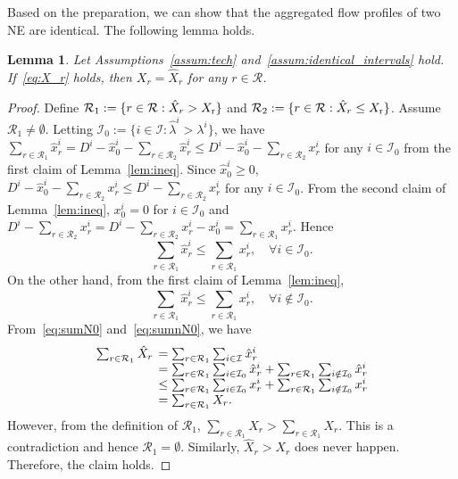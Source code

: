 \documentclass[letterpaper, 10 pt, conference]{ieeeconf}  %
\newcommand{\hs}{& \hspace{-2mm}}
\newcommand{\mc}[1]{\mathcal{#1}}
\newtheorem{lem}{Lemma}
\begin{document}
Based on the preparation, we can show that the aggregated flow profiles of two NE are identical.
The following lemma holds.
\begin{lem}\label{lem:Xr}
Let Assumptions~\ref{assum:tech} and~\ref{assum:identical_intervals} hold.
If~\eqref{eq:X_r} holds,
then $X_r=\hat{X}_r$ for any $r\in\mc{R}$.
\end{lem}
\begin{proof}
Define $\mc{R}_1:=\{r\in\mc{R}: \hat{X}_r>X_{\rm r}\}$ and $\mc{R}_2:=\{r \in \mc{R}: \hat{X}_r\leq X_{\rm r}\}$.
Assume $\mc{R}_1\neq \emptyset$.
Letting $\mc{I}_0:= \{i \in \mc{I}: \hat{\lambda}^i>\lambda^i\}$, we have $\sum_{r\in\mc{R}_1}\hat{x}^i_r=D^i-\hat{x}^i_0-\sum_{r\in\mc{R}_2}\hat{x}^i_r\leq D^i-\hat{x}^i_0-\sum_{r\in\mc{R}_2}x^i_r$ for any $i \in \mc{I}_0$ from the first claim of Lemma~\ref{lem:ineq}.
Since $\hat{x}^i_0\geq 0,$ $D^i-\hat{x}^i_0-\sum_{r\in\mc{R}_2}x^i_r \leq D^i-\sum_{r\in\mc{R}_2}x^i_r$ for any $i \in \mc{I}_0$.
From the second claim of Lemma~\ref{lem:ineq}, $x^i_0=0$ for $i \in \mc{I}_0$ and $D^i-\sum_{r\in\mc{R}_2}x^i_r=D^i-\sum_{r\in\mc{R}_2}x^i_r-x^i_0=\sum_{r\in\mc{R}_1}x^i_r.$
Hence
\begin{equation}\label{eq:sumN0}
 \textstyle{\sum_{r\in\mc{R}_1} \hat{x}^i_r \leq \sum_{r\in\mc{R}_1} x^i_r,\quad \forall i \in \mc{I}_0.}
\end{equation}
On the other hand, from the first claim of Lemma~\ref{lem:ineq},
\begin{equation}\label{eq:sumnN0}
 \textstyle{\sum_{r\in\mc{R}_1} \hat{x}^i_r \leq \sum_{r\in\mc{R}_1} x^i_r,\quad \forall i\notin\mc{I}_0.}
\end{equation}
From~\eqref{eq:sumN0} and~\eqref{eq:sumnN0}, we have
\[
\begin{array}{ll}
 \sum_{r\in\mc{R}_1}\hat{X}_r \hs = \sum_{r\in\mc{R}_1} \sum_{i \in \mc{I}} \hat{x}^i_r\\
  \hs = \sum_{r\in\mc{R}_1} \sum_{i \in \mc{I}_0} \hat{x}^i_r+\sum_{r\in\mc{R}_1} \sum_{i\notin\mc{I}_0} \hat{x}^i_r\\
  \hs \leq \sum_{r\in\mc{R}_1} \sum_{i \in \mc{I}_0} x^i_r+\sum_{r\in\mc{R}_1} \sum_{i\notin\mc{I}_0} x^i_r\\
 \hs = \sum_{r\in\mc{R}_1}X_r.
\end{array}
\]
However, from the definition of $\mc{R}_1$, $\sum_{r\in\mc{R}_1}\hat{X}_r > \sum_{r\in\mc{R}_1}X_r$.
This is a contradiction and hence $\mc{R}_1=\emptyset$.
Similarly, $\hat{X}_r>X_r$ does never happen.
Therefore, the claim holds.
\end{proof}
\end{document}
